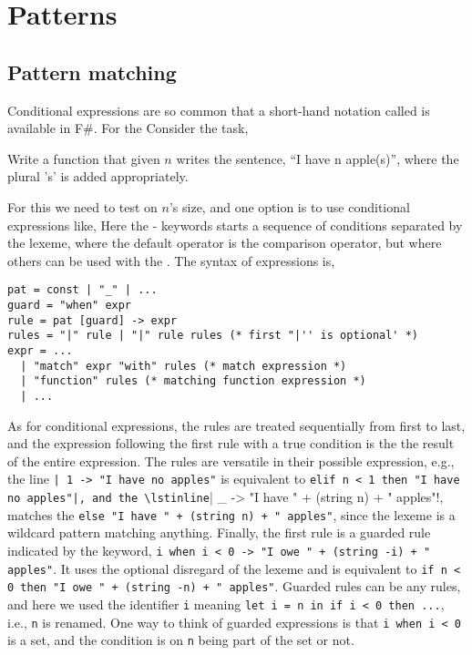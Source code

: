 \chapter{Patterns}
\label{chap:patterns}
\section{Pattern matching}
Conditional expressions are so common that a short-hand notation called  is available in F\#. For the 
Consider the task,
\begin{problem}
  Write a function that given $n$ writes the sentence, ``I have n apple(s)'', where the plural 's' is added appropriately.
\end{problem}
For this we need to test on $n$'s size, and one option is to use conditional expressions like,
%
%
Here the - keywords starts a sequence of conditions separated by the \lexeme{|} lexeme, where the default operator is the \lexeme{=} comparison operator, but where others can be used with the . The syntax of  expressions is,
\begin{lstlisting}[language=ebnf]
pat = const | "_" | ...
guard = "when" expr
rule = pat [guard] -> expr
rules = "|" rule | "|" rule rules (* first "|'' is optional' *)
expr = ... 
  | "match" expr "with" rules (* match expression *)
  | "function" rules (* matching function expression *)
  | ...
\end{lstlisting}
As for conditional expressions, the rules are treated sequentially from first to last, and the expression following the first rule with a true condition is the the result of the entire expression. The rules are versatile in their possible expression, e.g., the line \lstinline!| 1 -> "I have no apples"! is equivalent to \lstinline!elif n < 1 then "I have no apples"|, and the \lstinline!| \_ -> "I have " + (string n) + " apples"!, matches the \lstinline!else "I have " + (string n) + " apples"!, since the \lexeme{_} lexeme is a wildcard pattern matching anything. Finally, the first rule is a guarded rule indicated by the  keyword, \lstinline!i when i < 0 -> "I owe " + (string -i) + " apples"!. It uses the optional disregard of the \lexeme{|} lexeme and is equivalent to \lstinline!if n < 0 then "I owe " + (string -n) + " apples"!. Guarded rules can be any rules, and here we used the identifier \lstinline!i! meaning \lstinline!let i = n in if i < 0 then ...!, i.e., \lstinline!n! is renamed. One way to think of guarded expressions is that \lstinline!i when i < 0! is a set, and the condition is on \lstinline!n! being part of the set or not. 

